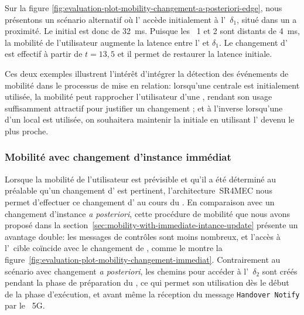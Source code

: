 \documentclass[../main.tex]{subfiles}
\begin{document}
Sur la figure \ref{fig:evaluation-plot-mobility-changement-a-posteriori-edge}, nous présentons un scénario alternatif où l’ accède initialement à l’~$\delta_1$, situé dans un  a proximité.
Le  initial est donc de 32~ms.
Puisque les ~1 et 2 sont distants de 4~ms, la mobilité de l’utilisateur augmente la latence entre l’ et $\delta_1$.
Le changement d’ est effectif à partir de $t=13,5$ et il permet de restaurer la latence initiale.

Ces deux exemples illustrent l’intérêt d’intégrer la détection des événements de mobilité dans le processus de mise en relation: lorsqu’une  centrale est initialement utilisée, la mobilité peut rapprocher l’utilisateur d’une , rendant son usage suffisamment attractif pour justifier un changement ; et à l’inverse lorsqu’une  d’un  local est utilisée, on souhaitera maintenir la  initiale en utilisant l’ devenu le plus proche.

\pagebreak
\enlargethispage*{1\baselineskip} %
\subsubsection{Mobilité avec changement d’instance immédiat}
\label{sec:testbed-mobility-changement-immediat}

Lorsque la mobilité de l’utilisateur est prévisible et qu’il a été déterminé au préalable qu’un changement d’ est pertinent, l’architecture~SR4MEC nous permet d’effectuer ce changement d’ au cours du .
En comparaison avec un changement d’instance \textit{a posteriori}, cette procédure de mobilité que nous avons proposé dans la section~\ref{sec:mobility-with-immediate-intance-update} présente un avantage double: les messages de contrôles sont moins nombreux, et l’accès à l’~cible coïncide avec le changement de , comme le montre la figure~\ref{fig:evaluation-plot-mobility-changement-immediat}.
Contrairement au scénario avec changement \textit{a posteriori}, les chemins pour accéder à l’~$\delta_2$ sont créés pendant la phase de préparation du , ce qui permet son utilisation dès le début de la phase d’exécution, et avant même la réception du message \texttt{Handover Notify} par le ~5G.
\end{document}
